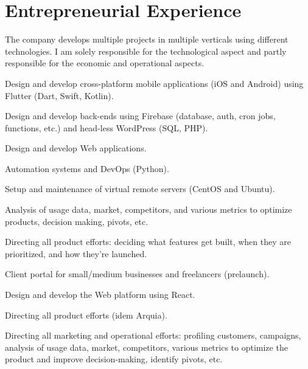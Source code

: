 \documentclass[]{robertino-cv}
\begin{document}
\hfill
\begin{minipage}[t]{0.50\textwidth} 


\section{Entrepreneurial Experience}

The company develops multiple projects in multiple verticals using different technologies. I am solely responsible for the technological aspect and partly responsible for the economic and operational aspects.
\vspace{\topsep} %
\begin{tightemize}
\item Design and develop cross-platform mobile applications (iOS and Android) using Flutter (Dart, Swift, Kotlin).
\item Design and develop back-ends using Firebase (database, auth, cron jobs, functions, etc.) and head-less WordPress (SQL, PHP). 
\item Design and develop Web applications.
\item Automation systems and DevOps (Python).
\item Setup and maintenance of virtual remote servers (CentOS and Ubuntu).
\item Analysis of usage data, market, competitors, and various metrics to optimize products, decision making, pivots, etc.
\item Directing all product efforts: deciding what features get built, when they are prioritized, and how they're launched.
\end{tightemize}
\sectionsep


Client portal for small/medium businesses and freelancers (prelaunch).
\begin{tightemize}
\item Design and develop the Web platform using React.
\item Directing all product efforts (idem Arquia).
\item Directing all marketing and operational efforts: profiling customers, campaigns, analysis of usage data, market, competitors, various metrics to optimize the product and improve decision-making, identify pivots, etc.
\end{tightemize}
\sectionsep



\end{minipage}
\end{document}
